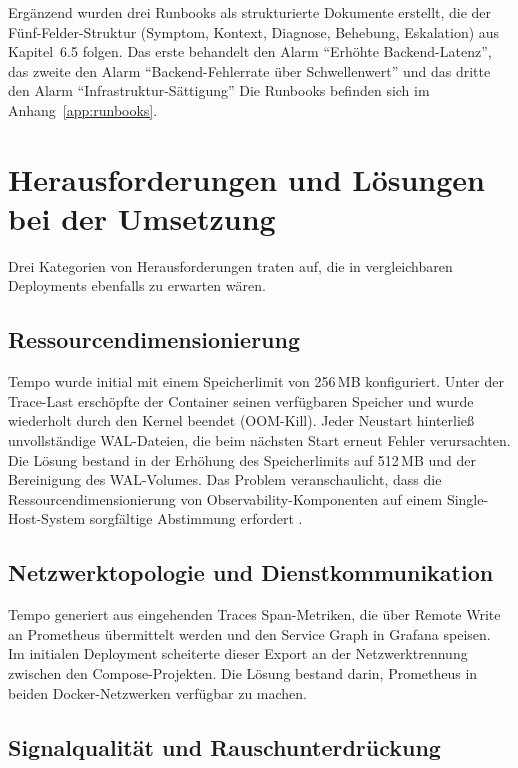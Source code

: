 Ergänzend wurden drei Runbooks als strukturierte Dokumente erstellt, die der Fünf-Felder-Struktur (Symptom, Kontext, Diagnose, Behebung, Eskalation) aus Kapitel~6.5 folgen. Das erste behandelt den Alarm ``Erhöhte Backend-Latenz'', das zweite den Alarm ``Backend-Fehlerrate über Schwellenwert'' und das dritte den Alarm ``Infrastruktur-Sättigung'' Die Runbooks befinden sich im Anhang~\ref{app:runbooks}.


\section{Herausforderungen und Lösungen bei der Umsetzung}

Drei Kategorien von Herausforderungen traten auf, die in vergleichbaren Deployments ebenfalls zu erwarten wären.

\subsection{Ressourcendimensionierung}

Tempo wurde initial mit einem Speicherlimit von 256\,MB konfiguriert. Unter der Trace-Last erschöpfte der Container seinen verfügbaren Speicher und wurde wiederholt durch den Kernel beendet (OOM-Kill). Jeder Neustart hinterließ unvollständige WAL-Dateien, die beim nächsten Start erneut Fehler verursachten. Die Lösung bestand in der Erhöhung des Speicherlimits auf 512\,MB und der Bereinigung des WAL-Volumes. Das Problem veranschaulicht, dass die Ressourcendimensionierung von Observability-Komponenten auf einem Single-Host-System sorgfältige Abstimmung erfordert \parencite[S.~52]{bissig2024unified}.


\subsection{Netzwerktopologie und Dienstkommunikation}

Tempo generiert aus eingehenden Traces Span-Metriken, die über Remote Write an Prometheus übermittelt werden und den Service Graph in Grafana speisen. Im initialen Deployment scheiterte dieser Export an der Netzwerktrennung zwischen den Compose-Projekten. Die Lösung bestand darin, Prometheus in beiden Docker-Netzwerken verfügbar zu machen.


\subsection{Signalqualität und Rauschunterdrückung}

